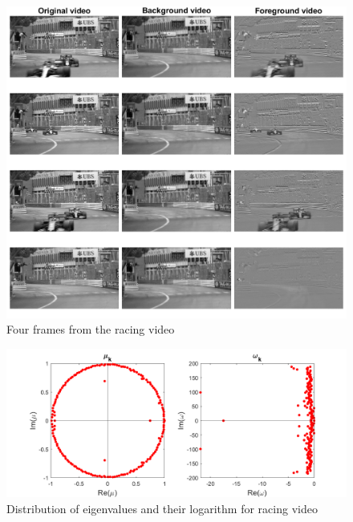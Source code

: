 \documentclass{article}
\begin{document}
\begin{figure}
	\centering
	\includegraphics[scale=0.7]{figs/monte_carlo_result}
	\caption{Four frames from the racing video}
	\label{fig:fig3}
\end{figure}


\begin{figure}
	\centering
	\includegraphics[scale=0.7]{figs/monte_carlo_eigen}
	\caption{Distribution of eigenvalues and their logarithm for racing video}
	\label{fig:fig1}
\end{figure}
\end{document}
